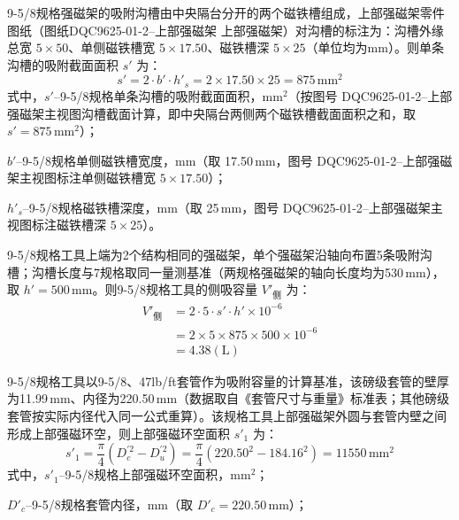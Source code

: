 9-5/8\inch 规格强磁架的吸附沟槽由中央隔台分开的两个磁铁槽组成，上部强磁架零件图纸（图纸DQC9625-01-2--上部强磁架 上部强磁架）对沟槽的标注为：沟槽外缘总宽 $5\times 50$、单侧磁铁槽宽 $5\times 17.50$、磁铁槽深 $5\times 25$（单位均为mm）。则单条沟槽的吸附截面面积 $s'$ 为：
\begin{equation}
    s' = 2 \cdot b' \cdot h'_{s} = 2 \times 17.50 \times 25 = 875\,\text{mm}^2
    \label{eq:mag_tool_side_section_9625}
\end{equation}
式中，$s'$--9-5/8\inch 规格单条沟槽的吸附截面面积，mm$^2$（按图号 DQC9625-01-2--上部强磁架主视图沟槽截面计算，即中央隔台两侧两个磁铁槽截面面积之和，取 $s' = 875\,\text{mm}^2$）；

$b'$--9-5/8\inch 规格单侧磁铁槽宽度，mm（取 17.50\,mm，图号 DQC9625-01-2--上部强磁架主视图标注单侧磁铁槽宽 $5\times 17.50$）；

$h'_{s}$--9-5/8\inch 规格磁铁槽深度，mm（取 25\,mm，图号 DQC9625-01-2--上部强磁架主视图标注磁铁槽深 $5\times 25$）。

9-5/8\inch 规格工具上端为2个结构相同的强磁架，单个强磁架沿轴向布置5条吸附沟槽；沟槽长度与7\inch 规格取同一量测基准（两规格强磁架的轴向长度均为530\,mm），取 $h' = 500\,\text{mm}$。则9-5/8\inch 规格工具的侧吸容量 $V'_{\text{侧}}$ 为：
\begin{equation}
	\begin{aligned}
    V'_{\text{侧}} &= 2 \cdot 5 \cdot s' \cdot h' \times 10^{-6} \\
                  &= 2 \times 5 \times 875 \times 500 \times 10^{-6} \\
                  &= 4.38(\text{L})
	\end{aligned}
    \label{eq:mag_tool_side_capacity_9625}
\end{equation}

9-5/8\inch 规格工具以9-5/8\inch、47lb/ft套管作为吸附容量的计算基准，该磅级套管的壁厚为11.99\,mm、内径为220.50\,mm（数据取自《套管尺寸与重量》标准表；其他磅级套管按实际内径代入同一公式重算）。该规格工具上部强磁架外圆与套管内壁之间形成上部强磁环空，则上部强磁环空面积 $s'_1$ 为：
\begin{equation}
    s'_1 = \frac{\pi}{4}\left(D_c^{\prime 2} - D_u^{\prime 2}\right) = \frac{\pi}{4}\left(220.50^2 - 184.16^2\right) = 11550\,\text{mm}^2
    \label{eq:mag_tool_annulus_9625}
\end{equation}
式中，$s'_1$--9-5/8\inch 规格上部强磁环空面积，mm$^2$；

$D'_c$--9-5/8\inch 规格套管内径，mm（取 $D'_c = 220.50\,\text{mm}$）；

